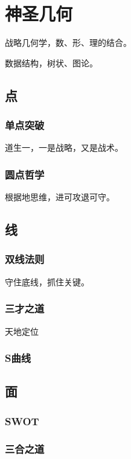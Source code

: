 \chapter{神圣几何}

战略几何学，数、形、理的结合。

数据结构，树状、图论。

\section{点}

\subsection{单点突破}

道生一，一是战略，又是战术。

\subsection{圆点哲学}

根据地思维，进可攻退可守。

\section{线}

\subsection{双线法则}

守住底线，抓住关键。

\subsection{三才之道}

天地定位

\subsection{S曲线}

\section{面}

\subsection{SWOT}

\subsection{三合之道}

